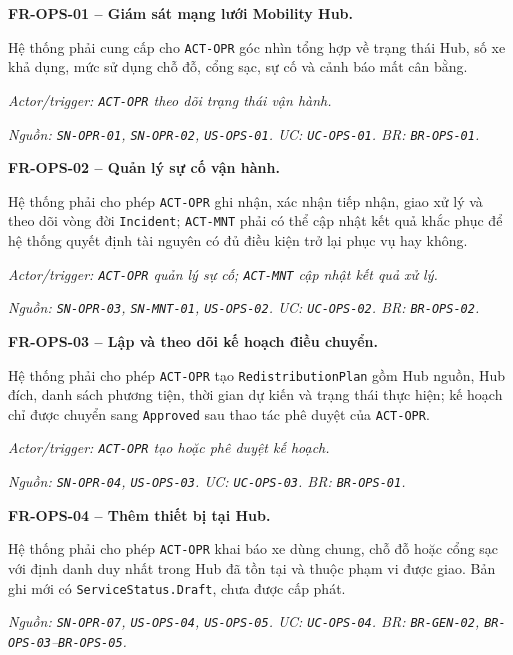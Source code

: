 \noindent\textbf{FR-OPS-01 -- Giám sát mạng lưới Mobility Hub.}\par
\nopagebreak[4]
Hệ thống phải cung cấp cho \texttt{ACT-OPR} góc nhìn tổng hợp về trạng thái Hub, số xe khả dụng, mức sử dụng chỗ đỗ, cổng sạc, sự cố và cảnh báo mất cân bằng.

\textit{Actor/trigger: \texttt{ACT-OPR} theo dõi trạng thái vận hành.}\par
\textit{Nguồn: \texttt{SN-OPR-01}, \texttt{SN-OPR-02}, \texttt{US-OPS-01}. UC: \texttt{UC-OPS-01}. BR: \texttt{BR-OPS-01}.}

\medskip
\noindent\textbf{FR-OPS-02 -- Quản lý sự cố vận hành.}\par
\nopagebreak[4]
Hệ thống phải cho phép \texttt{ACT-OPR} ghi nhận, xác nhận tiếp nhận, giao xử lý và theo dõi vòng đời \texttt{Incident}; \texttt{ACT-MNT} phải có thể cập nhật kết quả khắc phục để hệ thống quyết định tài nguyên có đủ điều kiện trở lại phục vụ hay không.

\textit{Actor/trigger: \texttt{ACT-OPR} quản lý sự cố; \texttt{ACT-MNT} cập nhật kết quả xử lý.}\par
\textit{Nguồn: \texttt{SN-OPR-03}, \texttt{SN-MNT-01}, \texttt{US-OPS-02}. UC: \texttt{UC-OPS-02}. BR: \texttt{BR-OPS-02}.}

\medskip
\noindent\textbf{FR-OPS-03 -- Lập và theo dõi kế hoạch điều chuyển.}\par
\nopagebreak[4]
Hệ thống phải cho phép \texttt{ACT-OPR} tạo \texttt{RedistributionPlan} gồm Hub nguồn, Hub đích, danh sách phương tiện, thời gian dự kiến và trạng thái thực hiện; kế hoạch chỉ được chuyển sang \texttt{Approved} sau thao tác phê duyệt của \texttt{ACT-OPR}.

\textit{Actor/trigger: \texttt{ACT-OPR} tạo hoặc phê duyệt kế hoạch.}\par
\textit{Nguồn: \texttt{SN-OPR-04}, \texttt{US-OPS-03}. UC: \texttt{UC-OPS-03}. BR: \texttt{BR-OPS-01}.}

\medskip
\noindent\textbf{FR-OPS-04 -- Thêm thiết bị tại Hub.}\par
\nopagebreak[4]
Hệ thống phải cho phép \texttt{ACT-OPR} khai báo xe dùng chung, chỗ đỗ hoặc cổng sạc với định danh duy nhất trong Hub đã tồn tại và thuộc phạm vi được giao. Bản ghi mới có \texttt{ServiceStatus.Draft}, chưa được cấp phát.

\textit{Nguồn: \texttt{SN-OPR-07}, \texttt{US-OPS-04}, \texttt{US-OPS-05}. UC: \texttt{UC-OPS-04}. BR: \texttt{BR-GEN-02}, \texttt{BR-OPS-03}--\texttt{BR-OPS-05}.}

